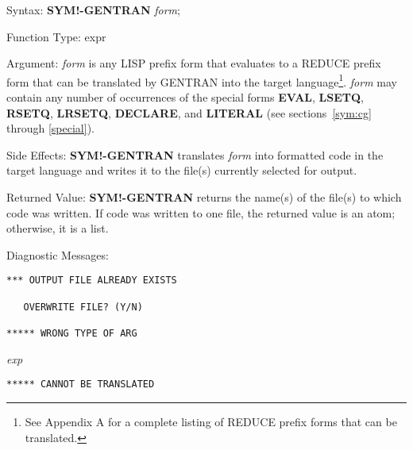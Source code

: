\begin{describe}{Syntax:}
{\bf SYM!-GENTRAN} {\it form\/};
\end{describe}
\begin{describe}{Function Type:}
expr
\end{describe} 
\begin{describe}{Argument:}
{\it form\/} is any LISP prefix form that evaluates to a
REDUCE prefix form that can be translated by GENTRAN into the target 
language\footnote{
See Appendix A for a complete listing of REDUCE prefix forms that can be
translated.}.
{\it form\/} may contain any number of occurrences of the special forms 
{\bf EVAL}, {\bf LSETQ}, {\bf RSETQ}, {\bf LRSETQ}, {\bf DECLARE}, and 
{\bf LITERAL} (see sections~\ref{sym:cg} through \ref{special}).
\end{describe}
\begin{describe}{Side Effects:}
{\bf SYM!-GENTRAN} translates {\it form\/} into formatted code in the target
language and writes it to the file(s) currently selected for output.
\end{describe}
\begin{describe}{Returned Value:}
{\bf SYM!-GENTRAN} returns the name(s) of the file(s) to which code
was written.  If code was written to one file, the returned value is an atom;
otherwise, it is a list.
\end{describe} 
\begin{describe}{Diagnostic Messages:}
\begin{verbatim}
*** OUTPUT FILE ALREADY EXISTS

   OVERWRITE FILE? (Y/N)

***** WRONG TYPE OF ARG
\end{verbatim}
{\it exp}
\begin{verbatim}
***** CANNOT BE TRANSLATED
\end{verbatim}
\end{describe} 
